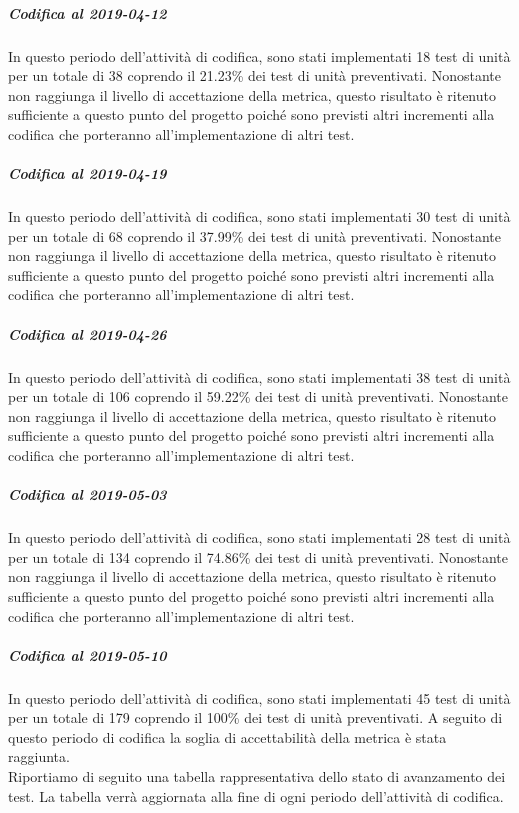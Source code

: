 \subparagraph{Codifica al 2019-04-12}
In questo periodo dell'attività di codifica, sono stati implementati 18 test di unità per un totale di 38 coprendo il 21.23\% dei test di unità preventivati.
Nonostante non raggiunga il livello di accettazione della
metrica, questo risultato è ritenuto sufficiente a questo punto del progetto poiché sono previsti altri incrementi alla codifica che porteranno all'implementazione di altri test.

\subparagraph{Codifica al 2019-04-19}
In questo periodo dell'attività di codifica, sono stati implementati 30 test di unità per un totale di 68 coprendo il 37.99\% dei test di unità preventivati.
Nonostante non raggiunga il livello di accettazione della
metrica, questo risultato è ritenuto sufficiente a questo punto del progetto poiché sono previsti altri incrementi alla codifica che porteranno all'implementazione di altri test.

\subparagraph{Codifica al 2019-04-26}
In questo periodo dell'attività di codifica, sono stati implementati 38 test di unità per un totale di 106 coprendo il 59.22\% dei test di unità preventivati.
Nonostante non raggiunga il livello di accettazione della
metrica, questo risultato è ritenuto sufficiente a questo punto del progetto poiché sono previsti altri incrementi alla codifica che porteranno all'implementazione di altri test.

\subparagraph{Codifica al 2019-05-03}
In questo periodo dell'attività di codifica, sono stati implementati 28 test di unità per un totale di 134 coprendo il 74.86\% dei test di unità preventivati.
Nonostante non raggiunga il livello di accettazione della
metrica, questo risultato è ritenuto sufficiente a questo punto del progetto poiché sono previsti altri incrementi alla codifica che porteranno all'implementazione di altri test.

\subparagraph{Codifica al 2019-05-10}
In questo periodo dell'attività di codifica, sono stati implementati 45 test di unità per un totale di 179 coprendo il 100\% dei test di unità preventivati.
A seguito di questo periodo di codifica la soglia di accettabilità della metrica è stata raggiunta.\\

Riportiamo di seguito una tabella rappresentativa dello stato di avanzamento dei test. La tabella verrà aggiornata alla fine di ogni periodo dell'attività di codifica.

